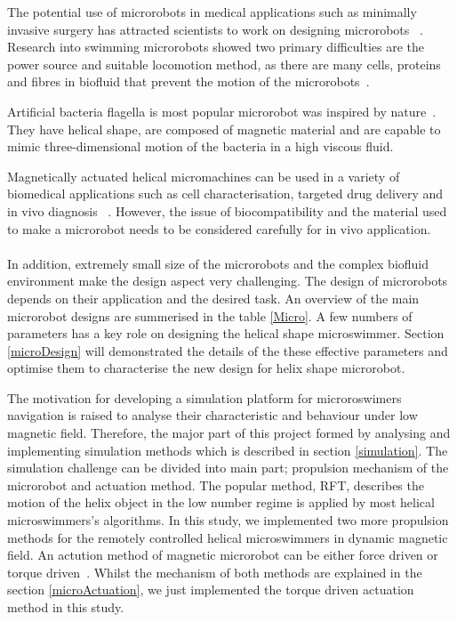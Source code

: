 \documentclass[12pt,a4paper,titlepage]{report}
\begin{document}
The potential use of microrobots in medical applications such as minimally invasive surgery 
has attracted scientists to work on designing microrobots ~\citep{edd2003biomimetic}. Research into swimming 
microrobots showed two primary difficulties are the power source and suitable locomotion method, as
 there are many cells, proteins and fibres in biofluid that prevent the motion of the microrobots~\citep{peyer2013bio}. 

Artificial bacteria flagella is most popular microrobot was inspired by nature~\citep{qiu2014noncytotoxic}. 
They have helical shape, are composed of magnetic material and are capable to mimic three-dimensional 
motion of the bacteria in a high viscous fluid.

Magnetically actuated helical micromachines can be used
 in a variety of biomedical applications such as cell characterisation, targeted drug delivery and in vivo 
diagnosis ~\citep{peyer2013magnetic}. However, the issue of biocompatibility and the material 
used to make a microrobot needs to be considered carefully for in vivo application\citep{qiu2014noncytotoxic}. 


\paragraph{}
In addition, extremely small size of the microrobots and the
complex biofluid environment make the design aspect very challenging. 
The design of microrobots depends on their application and the desired task. An overview of the main
 microrobot designs are summerised in the table \ref{Micro}. A few numbers of parameters 
has a key role on designing the helical shape microswimmer. Section \ref{microDesign} will demonstrated 
the details of the these effective parameters and optimise them to characterise the new design for 
helix shape microrobot. 


The motivation for developing a simulation platform for microroswimers navigation is raised to analyse
 their characteristic and behaviour under low magnetic field.
Therefore, the major part of this project formed by analysing and implementing simulation methods
 which is described in section \ref{simulation}. The simulation
challenge can be divided into main part; propulsion mechanism of the microrobot and actuation method. The
popular method, \ac*{RFT}, describes the motion of the helix object in the low number regime 
is applied by most helical microswimmers\rq{}s algorithms\citep{qiu2014noncytotoxic}. In this
study, we implemented two more propulsion methods for the remotely controlled helical microswimmers
 in dynamic magnetic field. An actution method of magnetic microrobot can be either force driven or
torque driven~\citep{qiunanohelices}. Whilst the mechanism of both methods are explained in the section \ref{microActuation}, we
just implemented the torque driven actuation method in this study. 
\end{document}
